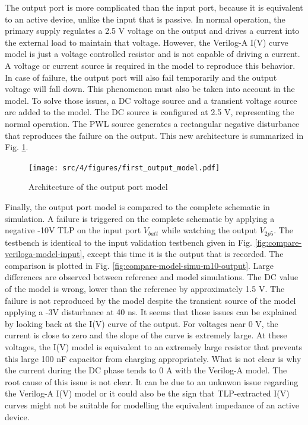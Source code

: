 The output port is more complicated than the input port, because it is equivalent to an active device, unlike the input that is passive.
In normal operation, the primary supply regulates a 2.5 V voltage on the output and drives a current into the external load to maintain that voltage.
However, the Verilog-A I(V) curve model is just a voltage controlled resistor and is not capable of driving a current.
A voltage or current source is required in the model to reproduce this behavior.
In case of failure, the output port will also fail temporarily and the output voltage will fall down.
This phenomenon must also be taken into account in the model.
To solve those issues, a DC voltage source and a transient voltage source are added to the model.
The DC source is configured at 2.5 V, representing the normal operation.
The PWL source generates a rectangular negative disturbance that reproduces the failure on the output.
This new architecture is summarized in Fig. \ref{fig:first-output-model}.

\begin{figure}[!h]
  \centering
  \texttt{[image: src/4/figures/first\_output\_model.pdf]}
  \caption{Architecture of the output port model}
  \label{fig:first-output-model}
\end{figure}

Finally, the output port model is compared to the complete schematic in simulation.
A failure is triggered on the complete schematic by applying a negative -10V TLP on the input port $V_{batt}$ while watching the output $V_{2p5}$.
The testbench is identical to the input validation testbench given in Fig. \ref{fig:compare-veriloga-model-input}, except this time it is the output that is recorded.
The comparison is plotted in Fig. \ref{fig:compare-model-simu-m10-output}.
Large differences are observed between reference and model simulations.
The DC value of the model is wrong, lower than the reference by approximately 1.5 V.
The failure is not reproduced by the model despite the transient source of the model applying a -3V disturbance at 40 ns.
It seems that those issues can be explained by looking back at the I(V) curve of the output.
For voltages near 0 V, the current is close to zero and the slope of the curve is extremely large.
At these voltages, the I(V) model is equivalent to an extremely large resistor that prevents this large 100 nF capacitor from charging appropriately.
What is not clear is why the current during the DC phase tends to 0 A with the Verilog-A model.
The root cause of this issue is not clear.
It can be due to an unknwon issue regarding the Verilog-A I(V) model or it could also be the sign that TLP-extracted I(V) curves might not be suitable for modelling the equivalent impedance of an active device.

